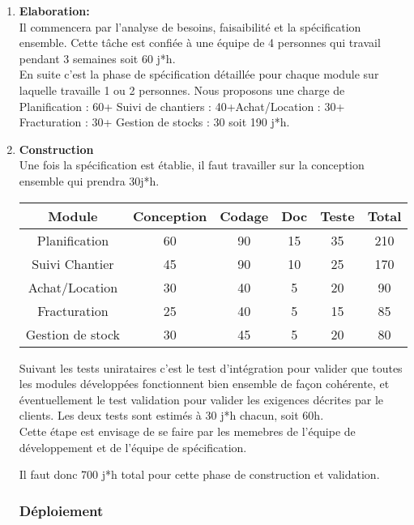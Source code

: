 \begin{enumerate}
\item \textbf{Elaboration:}\\ Il commencera par l'analyse de besoins, faisaibilité et la spécification ensemble. Cette tâche est confiée à une équipe de 4 personnes qui travail pendant 3 semaines soit 60 j*h. \\

En suite c'est la phase de spécification détaillée pour chaque module sur laquelle travaille 1 ou 2 personnes. Nous proposons une charge de Planification : 60+ Suivi de chantiers : 40+Achat/Location : 30+ Fracturation : 30+	Gestion de stocks : 30 soit 190 j*h.

\item \textbf{Construction}\\
Une fois la spécification est établie, il faut travailler sur la conception ensemble qui prendra 30j*h. 

\begin{center} 
    \begin{tabular}{ |c| c| c | c | c |c |}
    \hline
	 Module&Conception&Codage&Doc&Teste&Total\\ \hline
    Planification & 60 & 90 & 15 &35&210\\ \hline
    Suivi Chantier &45&90&10&25&170 \\ \hline
    Achat/Location &30&40&5&20&90  \\ \hline
    Fracturation &25&40&5&15&85\\ \hline
    Gestion de stock &30&45&5&20&80 \\
    \hline
    \end{tabular}
\end{center}

Suivant les tests unirataires c'est le test d'intégration pour valider que toutes les modules développées fonctionnent bien ensemble de façon cohérente, et éventuellement le test validation pour valider les exigences décrites par le clients. Les deux tests sont estimés à 30 j*h chacun, soit 60h.\\

Cette étape est envisage de se faire par les memebres de l'équipe de développement et de l'équipe de spécification. 

Il faut donc 700 j*h total pour cette phase de construction et validation.

\subsubsection{Déploiement}


\end{enumerate}
